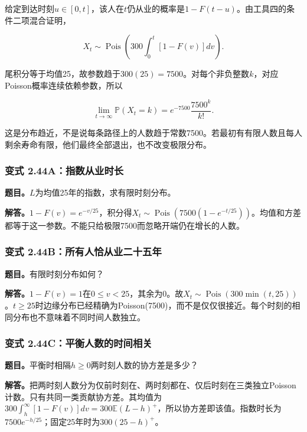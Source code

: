 \documentclass[12pt,a4paper,UTF8,fontset=fandol]{ctexart}
\begin{document}
给定到达时刻\(u\in[0,t]\)，该人在\(t\)仍从业的概率是\(1-F(t-u)\)。由工具四的条件二项混合证明，

\[X_t\sim\operatorname{Pois}\left(300\int_0^t[1-F(v)]dv\right).\]

尾积分等于均值25，故参数趋于\(300(25)=7500\)。对每个非负整数\(k\)，对应Poisson概率连续依赖参数，所以

\[\boxed{\lim_{t\to\infty}\mathbb P(X_t=k)=e^{-7500}\frac{7500^k}{k!}.}\]

这是分布趋近，不是说每条路径上的人数趋于常数7500。若最初有有限人数且每人剩余寿命有限，他们最终全部退出，也不改变极限分布。

\subsubsection{变式
2.44A：指数从业时长}\label{ux53d8ux5f0f-2.44aux6307ux6570ux4eceux4e1aux65f6ux957f}

\textbf{题目。}\(L\)为均值25年的指数，求有限时刻分布。

\textbf{解答。}\(1-F(v)=e^{-v/25}\)，积分得\(X_t\sim\operatorname{Pois}(7500(1-e^{-t/25}))\)。均值和方差都等于这一参数。不能只给极限7500而忽略开端仍在增长的人数。

\subsubsection{变式
2.44B：所有人恰从业二十五年}\label{ux53d8ux5f0f-2.44bux6240ux6709ux4ebaux6070ux4eceux4e1aux4e8cux5341ux4e94ux5e74}

\textbf{题目。}有限时刻分布如何？

\textbf{解答。}\(1-F(v)=1\)在\(0\le v<25\)，其余为0。故\(X_t\sim\operatorname{Pois}(300\min(t,25))\)。\(t\ge25\)时边缘分布已经精确为Poisson(7500)，而不是仅仅很接近。每个时刻的相同分布也不意味着不同时间人数独立。

\subsubsection{变式
2.44C：平衡人数的时间相关}\label{ux53d8ux5f0f-2.44cux5e73ux8861ux4ebaux6570ux7684ux65f6ux95f4ux76f8ux5173}

\textbf{题目。}平衡时相隔\(h\ge0\)两时刻人数的协方差是多少？

\textbf{解答。}把两时刻人数分为仅前时刻在、两时刻都在、仅后时刻在三类独立Poisson计数。只有共同一类贡献协方差。其均值为\(300\int_h^\infty[1-F(v)]dv=300\mathbb E(L-h)^+\)，所以协方差即该值。指数时长为\(7500e^{-h/25}\)；固定25年时为\(300(25-h)^+\)。
\end{document}
